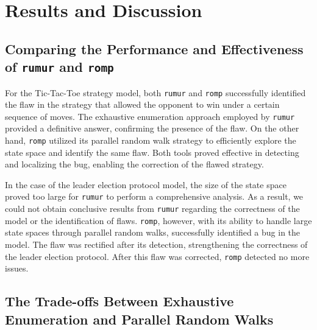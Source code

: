 
\section{Results and Discussion}\label{sec:results-and-discussion}

\subsection{Comparing the Performance and Effectiveness of \texttt{rumur} and \texttt{romp}}\label{subsec:comparing-the-performance-and-effectiveness-of-rumur-and-romp}

For the Tic-Tac-Toe strategy model, both \texttt{rumur} and \texttt{romp}
successfully identified the flaw in the strategy that allowed the opponent to
win under a certain sequence of moves.
The exhaustive enumeration approach employed by \texttt{rumur} provided a
definitive answer, confirming the presence of the flaw.
On the other hand, \texttt{romp} utilized its parallel random walk strategy
to efficiently explore the state space and identify the same flaw.
Both tools proved effective in detecting and localizing the bug, enabling the
correction of the flawed strategy.

In the case of the leader election protocol model, the size of the state
space proved too large for \texttt{rumur} to perform a comprehensive analysis.
As a result, we could not obtain conclusive results from \texttt{rumur}
regarding the correctness of the model or the identification of flaws.
\texttt{romp}, however, with its ability to handle large state spaces through
parallel random walks, successfully identified a bug in the model.
The flaw was rectified after its detection, strengthening the correctness of
the leader election protocol.
After this flaw was corrected, \texttt{romp} detected no more issues.

\subsection{The Trade-offs Between Exhaustive Enumeration and Parallel Random Walks}\label{subsec:the-trade-offs-between-exhaustive-enumeration-and-parallel-random-walks}

